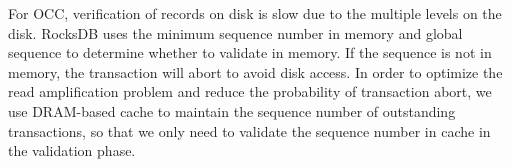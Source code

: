 For OCC, verification of records on disk is slow due to the multiple levels on the disk. RocksDB uses the minimum sequence number in memory and global sequence to determine whether to validate in memory. If the sequence is not in memory, the transaction will abort to avoid disk access. In order to optimize the read amplification problem and reduce the probability of transaction abort, we use DRAM-based cache to maintain the sequence number of outstanding transactions, so that we only need to validate the sequence number in cache in the validation phase.
